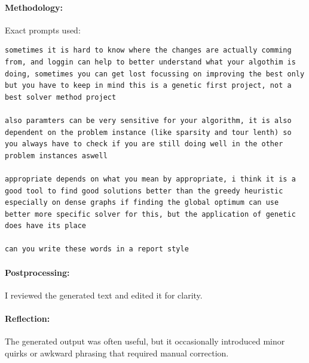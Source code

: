 \documentclass[a4paper,10pt]{article}
\begin{document}
\paragraph{Methodology:}
Exact prompts used:
\begin{lstlisting}
sometimes it is hard to know where the changes are actually comming from, and loggin can help to better understand what your algothim is doing, sometimes you can get lost focussing on improving the best only but you have to keep in mind this is a genetic first project, not a best solver method project

also paramters can be very sensitive for your algorithm, it is also dependent on the problem instance (like sparsity and tour lenth) so you always have to check if you are still doing well in the other problem instances aswell

appropriate depends on what you mean by appropriate, i think it is a good tool to find good solutions better than the greedy heuristic especially on dense graphs if finding the global optimum can use better more specific solver for this, but the application of genetic does have its place

can you write these words in a report style
\end{lstlisting}
\paragraph{Postprocessing:}
I reviewed the generated text and edited it for clarity.
\paragraph{Reflection:}
The generated output was often useful, but it occasionally introduced minor quirks or awkward phrasing that required manual correction.
\end{document}
